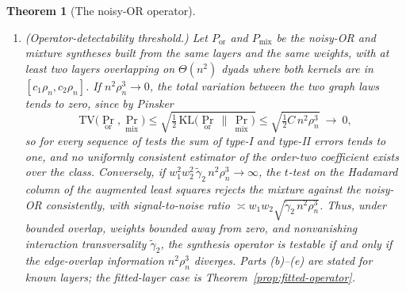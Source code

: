 \documentclass[12pt]{article}
\newtheorem{theorem}{Theorem}
\newcommand{\1}{\mathbf{1}}
\newcommand{\norm}[1]{\left\lVert#1\right\rVert}
\newcommand{\KL}{\mathrm{KL}}
\begin{document}
\begin{theorem}[The noisy-OR operator]
\begin{enumerate}[label=(\alph*),leftmargin=2em,itemsep=2pt]
\[
\bigl|\widehat c_S-(-1)^{|S|+1}\textstyle\prod_{k\in S}w_k\bigr|
\ =\ O_P\!\Bigl(\widetilde\gamma_j^{-1/2}\,\frac{1}{n\,\rho_n^{\,i-1/2}}\Bigr)
\ +\ O\!\Bigl(\widetilde\gamma_j^{-1}\,K^{\,j+1}\rho_n^{\,j+1-i}\Bigr),
\]
the second term the omitted-mass bias of the orders beyond $j$. In particular plain linear least
squares ($j=1$) estimates the weights with bias $O(K^2\rho_n/\widetilde\gamma_1)$, the order-$j$
correction reduces it to $O(K^{j+1}\rho_n^{\,j}/\widetilde\gamma_j)$, and, provided the number of
layers is large enough that such an order is available ($j\le K$), any
\[
j\ \ge\ \Bigl(\tfrac12+o(1)\Bigr)\,\frac{\log(n^2\rho_n)}{\log(1/\rho_n)}
\]
drives the bias below the edge rate. For $j=2$ this is a complete estimator of $(w_1,w_2)$; for
$j\ge3$ the displayed bound is a rate for the \emph{free} order-$j$ coefficients $\widehat c_S$:
the normalised coordinate $\widehat c_S\norm{\mathbf m_S}_F$ attains the edge rate $1/(n\sqrt{\rho_n})$,
while the unnormalised coefficient $\widehat c_S$ is estimated at the slower
$O_P(\widetilde\gamma^{-1/2}/(n\rho_n^{\,j-1/2}))$ because its column has Frobenius norm $n\rho_n^{\,j}$.
Recovering the constrained product structure $c_S=(-1)^{|S|+1}\prod_{k\in S}w_k$ for $K\ge3$ is a
conjecture (Remark~\ref{rem:nork-conj}).
\item \emph{(Operator-detectability threshold.)} Let $P_{\mathrm{or}}$ and $P_{\mathrm{mix}}$ be the
noisy-OR and mixture syntheses built from the same layers and the same weights, with at least two
layers overlapping on $\Theta(n^2)$ dyads where both kernels are in $[c_1\rho_n,c_2\rho_n]$. If
$n^2\rho_n^3\to0$, the total variation between the two graph laws tends to zero, since by Pinsker
\[
\mathrm{TV}\bigl(\Pr_{\mathrm{or}},\Pr_{\mathrm{mix}}\bigr)\le\sqrt{\tfrac12\,
\KL\bigl(\Pr_{\mathrm{or}}\,\big\|\,\Pr_{\mathrm{mix}}\bigr)}\le\sqrt{\tfrac12 C\,n^2\rho_n^3}\ \to\ 0 ,
\]
so for every sequence of tests the sum of type-I and type-II errors tends to one, and no uniformly
consistent estimator of the order-two coefficient exists over the class. Conversely, if
$w_1^2w_2^2\,\widetilde\gamma_2\,n^2\rho_n^3\to\infty$, the $t$-test on the Hadamard column of the
augmented least squares rejects the mixture against the noisy-OR consistently, with
signal-to-noise ratio $\asymp w_1w_2\sqrt{\widetilde\gamma_2\,n^2\rho_n^3}$. Thus, under bounded
overlap, weights bounded away from zero, and nonvanishing interaction transversality
$\widetilde\gamma_2$, the synthesis operator is testable if and only if the \emph{edge-overlap
information} $n^2\rho_n^3$ diverges. Parts \textup{(b)}--\textup{(e)} are stated for known layers; the fitted-layer case is
Theorem~\ref{prop:fitted-operator}.

\end{enumerate}
\end{theorem}
\end{document}
